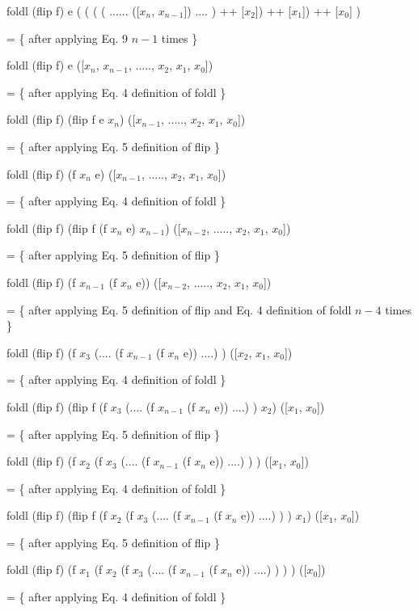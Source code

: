 \documentclass[twocolumn]{revtex4}
\begin{document}
	 foldl (flip f) e ( ( ( ( ...... ([$x_{n}$, $x_{n-1}$]) .... ) ++ [$x_{2}$]) ++ [$x_{1}$]) ++ [$x_{0}$] )

	 = \{ after applying Eq. 9 $n - 1$ times \}
	 
	 foldl (flip f) e ([$x_{n}$, $x_{n-1}$, ....., $x_{2}$, $x_{1}$, $x_{0}$])
	 
	 = \{ after applying Eq. 4 definition of foldl \}
	 
	 foldl (flip f) (flip f e $x_{n}$) ([$x_{n-1}$, ....., $x_{2}$, $x_{1}$, $x_{0}$])
	 
	 = \{ after applying Eq. 5 definition of flip \}
	 
	 foldl (flip f) (f $x_{n}$ e) ([$x_{n-1}$, ....., $x_{2}$, $x_{1}$, $x_{0}$])
	 
	 = \{ after applying Eq. 4 definition of foldl \}
	 
	 foldl (flip f) (flip f (f $x_{n}$ e) $x_{n-1}$) ([$x_{n-2}$, ....., $x_{2}$, $x_{1}$, $x_{0}$])
	 
	 = \{ after applying Eq. 5 definition of flip \}
	 
	 foldl (flip f) (f $x_{n-1}$ (f $x_{n}$ e)) ([$x_{n-2}$, ....., $x_{2}$, $x_{1}$, $x_{0}$])
	 
	 = \{ after applying Eq. 5 definition of flip and Eq. 4 definition of foldl $n - 4$ times \}
	 
	 foldl (flip f) (f $x_{3}$ (.... (f $x_{n-1}$ (f $x_{n}$ e)) ....) ) ([$x_{2}$, $x_{1}$, $x_{0}$])

	 = \{ after applying Eq. 4 definition of foldl \}
	 
	 foldl (flip f) (flip f (f $x_{3}$ (.... (f $x_{n-1}$ (f $x_{n}$ e)) ....) ) $x_{2}$) ([$x_{1}$, $x_{0}$])

	 = \{ after applying Eq. 5 definition of flip \}
	 
	 foldl (flip f) (f $x_{2}$ (f $x_{3}$ (.... (f $x_{n-1}$ (f $x_{n}$ e)) ....) ) ) ([$x_{1}$, $x_{0}$])

	 = \{ after applying Eq. 4 definition of foldl \}
	 
	 foldl (flip f) (flip f (f $x_{2}$ (f $x_{3}$ (.... (f $x_{n-1}$ (f $x_{n}$ e)) ....) ) ) $x_{1}$) ([$x_{1}$, $x_{0}$])

	 = \{ after applying Eq. 5 definition of flip \}
	 
	 foldl (flip f) (f $x_{1}$ (f $x_{2}$ (f $x_{3}$ (.... (f $x_{n-1}$ (f $x_{n}$ e)) ....) ) ) ) ([$x_{0}$])

	 = \{ after applying Eq. 4 definition of foldl \}
	 
\end{document}

